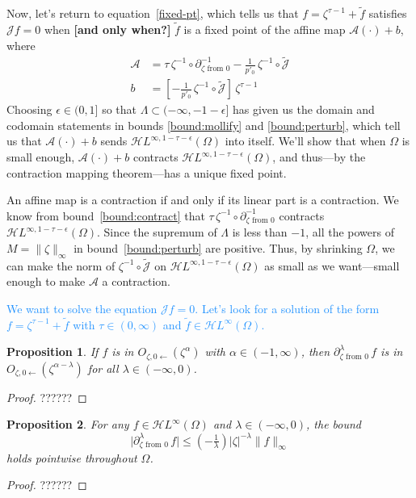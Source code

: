 \documentclass{article}
\theoremstyle{plain}
\newtheorem{prop}{Proposition}
\newcommand{\holoL}[1]{\mathcal{H}L^{#1}} %
\begin{document}
Now, let's return to equation~\ref{fixed-pt}, which tells us that $f = \zeta^{\tau-1} + \tilde{f}$ satisfies $\mathcal{J}f = 0$ when \textbf{[and only when?]} $\tilde{f}$ is a fixed point of the affine map $\mathcal{A}(\cdot) + b$, where
\begin{align*}
\mathcal{A} & = \tau\,\zeta^{-1} \circ \partial^{-1}_{\zeta \text{ from } 0} - \tfrac{1}{p'_0}\,\zeta^{-1} \circ \tilde{\mathcal{J}} \\
b & = \left[ -\tfrac{1}{p'_0}\,\zeta^{-1} \circ \tilde{\mathcal{J}} \right]\,\zeta^{\tau-1}
\end{align*}
Choosing $\epsilon \in (0, 1]$ so that $\Lambda \subset (-\infty, -1 - \epsilon]$ has given us the domain and codomain statements in bounds \ref{bound:mollify} and \ref{bound:perturb}, which tell us that $\mathcal{A}(\cdot) + b$ sends $\mathcal{H}L^{\infty, 1-\tau-\epsilon}(\Omega)$ into itself. We'll show that when $\Omega$ is small enough, $\mathcal{A}(\cdot) + b$ contracts $\mathcal{H}L^{\infty, 1-\tau-\epsilon}(\Omega)$, and thus---by the contraction mapping theorem---has a unique fixed point.

An affine map is a contraction if and only if its linear part is a contraction. We know from bound~\ref{bound:contract} that $\tau\,\zeta^{-1} \circ \partial^{-1}_{\zeta \text{ from } 0}$ contracts $\mathcal{H}L^{\infty, 1-\tau-\epsilon}(\Omega)$. Since the supremum of $\Lambda$ is less than $-1$, all the powers of $M = \|\zeta\|_\infty$ in bound~\ref{bound:perturb} are positive. Thus, by shrinking $\Omega$, we can make the norm of $\zeta^{-1} \circ \tilde{\mathcal{J}}$ on $\mathcal{H}L^{\infty, 1-\tau-\epsilon}(\Omega)$ as small as we want---small enough to make $\mathcal{A}$ a contraction.

\textcolor{DodgerBlue}{We want to solve the equation $\mathcal{J}f = 0$. Let's look for a solution of the form $f = \zeta^{\tau-1} + \tilde{f}$ with $\tau \in (0, \infty)$ and $\tilde{f} \in \holoL{\infty}(\Omega)$.}

\color{SeaGreen}
\begin{prop}\label{prop:frac-mollify}
If $f$ is in $O_{\zeta, 0 \leftarrow}(\zeta^\alpha)$ with $\alpha \in (-1, \infty)$, then $\partial^\lambda_{\zeta \text{ from } 0}\,f$ is in $O_{\zeta, 0 \leftarrow}(\zeta^{\alpha-\lambda})$ for all $\lambda \in (-\infty, 0)$.
\end{prop}
\color{magenta}
\begin{proof}
??????
\end{proof}
\color{SeaGreen}
\begin{prop}\label{prop:frac-int-growth}
For any $f \in \holoL{\infty}(\Omega)$ and $\lambda \in (-\infty, 0)$, the bound
\[ \big|\partial^\lambda_{\zeta \text{ from } 0}\,f\big| \le (-\tfrac{1}{\lambda}) |\zeta|^{-\lambda} \|f\|_\infty \]
holds pointwise throughout $\Omega$.
\end{prop}
\color{magenta}
\begin{proof}
??????
\end{proof}
\color{DodgerBlue}
\end{document}
